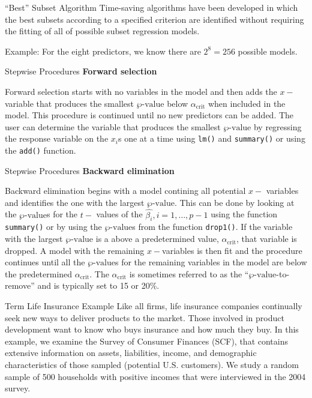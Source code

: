 \documentclass[
  ignorenonframetext,
]{beamer}
\begin{document}
\begin{frame}{``Best'' Subset Algorithm}
\protect\hypertarget{best-subset-algorithm}{}
Time-saving algorithms have been developed in which the best subsets
according to a specified criterion are identified without requiring the
fitting of all of possible subset regression models.

Example: For the eight predictors, we know there are \(2^8=256\)
possible models.
\end{frame}

\begin{frame}[fragile]{Stepwise Procedures}
\protect\hypertarget{stepwise-procedures}{}
\textbf{Forward selection}

Forward selection starts with no variables in the model and then adds
the \(x-\)variable that produces the smallest \(\wp\text{-value}\) below
\(\alpha_{\text{crit}}\) when included in the model. This procedure is
continued until no new predictors can be added. The user can determine
the variable that produces the smallest \(\wp\text{-value}\) by
regressing the response variable on the \(x_i\)s one at a time using
\texttt{lm()} and \texttt{summary()} or using the \texttt{add()}
function.
\end{frame}

\begin{frame}[fragile]{Stepwise Procedures}
\protect\hypertarget{stepwise-procedures-1}{}
\textbf{Backward elimination}

Backward elimination begins with a model contining all potential \(x-\)
variables and identifies the one with the largest \(\wp\text{-value}\).
This can be done by looking at the \(\wp\text{-value}\)s for the \(t-\)
values of the \(\hat{\beta_i}, i = 1, \ldots,p-1\) using the function
\texttt{summary()} or by using the \(\wp\text{-value}\)s from the
function \texttt{drop1()}. If the variable with the largest
\(\wp\text{-value}\) is a above a predetermined value,
\(\alpha_{\text{crit}}\), that variable is dropped. A model with the
remaining \(x-\)variables is then fit and the procedure continues until
all the \(\wp\text{-value}\)s for the remaining variables in the model
are below the predetermined \(\alpha_{\text{crit}}\). The
\(\alpha_{\text{crit}}\) is sometimes referred to as the
``\(\wp\text{-value}\)-to-remove'' and is typically set to 15 or 20\%.
\end{frame}

\begin{frame}{Term Life Insurance Example}
\protect\hypertarget{term-life-insurance-example-4}{}
Like all firms, life insurance companies continually seek new ways to
deliver products to the market. Those involved in product development
want to know who buys insurance and how much they buy. In this example,
we examine the Survey of Consumer Finances (SCF), that contains
extensive information on assets, liabilities, income, and demographic
characteristics of those sampled (potential U.S. customers). We study a
random sample of 500 households with positive incomes that were
interviewed in the 2004 survey.
\end{frame}
\end{document}
